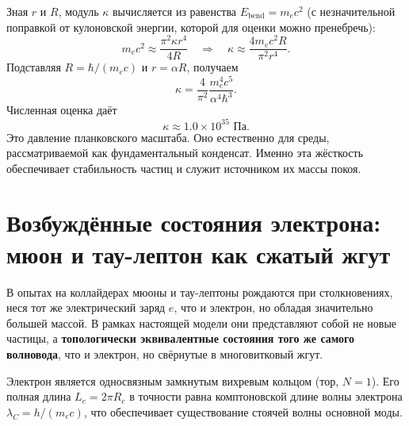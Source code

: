 \documentclass[12pt,a4paper]{article}
\begin{document}
Зная $r$ и $R$, модуль $\kappa$ вычисляется из равенства $E_{\text{bend}} = m_e c^2$ (с незначительной поправкой от кулоновской энергии, которой для оценки можно пренебречь):
\begin{equation}
m_e c^2 \approx \frac{\pi^2 \kappa r^4}{4R}
\quad\Longrightarrow\quad
\kappa \approx \frac{4 m_e c^2 R}{\pi^2 r^4}.
\label{eq:kappa_approx}
\end{equation}
Подставляя $R = \hbar/(m_e c)$ и $r = \alpha R$, получаем
\begin{equation}
\kappa = \frac{4}{\pi^2} \frac{m_e^4 c^5}{\alpha^4 \hbar^3}.
\label{eq:kappa_exact}
\end{equation}
Численная оценка даёт
\begin{equation}
\kappa \approx 1.0 \times 10^{35} \text{ Па}.
\end{equation}
Это давление планковского масштаба. Оно естественно для среды, рассматриваемой как фундаментальный конденсат. Именно эта жёсткость обеспечивает стабильность частиц и служит источником их массы покоя.

\section{Возбуждённые состояния электрона: мюон и тау-лептон как сжатый жгут}

В опытах на коллайдерах мюоны и тау-лептоны рождаются при столкновениях, неся тот же электрический заряд $e$, что и электрон, но обладая значительно большей массой. В рамках настоящей модели они представляют собой не новые частицы, а \textbf{топологически эквивалентные состояния того же самого волновода}, что и электрон, но свёрнутые в многовитковый жгут.

Электрон является односвязным замкнутым вихревым кольцом (тор, $N=1$). Его полная длина $L_e = 2\pi R_e$ в точности равна комптоновской длине волны электрона $\lambda_C = h/(m_e c)$, что обеспечивает существование стоячей волны основной моды.
\end{document}
